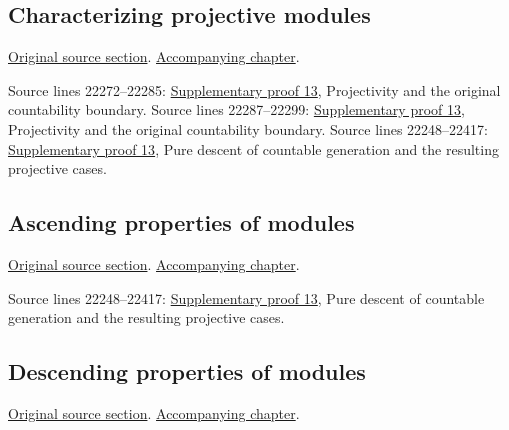 \subsection{Characterizing projective modules}
\hypertarget{algebra-source-section-characterize-projective}{}
\noindent\href{https://github.com/stacks/stacks-project/blob/a04446e57ec1fbc252a871afcec7752fb2807b14/algebra.tex\#L22184}{Original source section}. \href{algebra.pdf\#nameddest=section-characterize-projective}{Accompanying chapter}.

\begin{AlgebraSourceRoutes}
 Source lines 22272--22285: \hyperlink{algebra_ml_coherent_notes_20260927}{Supplementary proof 13}, Projectivity and the original countability boundary.
 Source lines 22287--22299: \hyperlink{algebra_ml_coherent_notes_20260927}{Supplementary proof 13}, Projectivity and the original countability boundary.
 Source lines 22248--22417: \hyperlink{algebra_ml_coherent_notes_20260927}{Supplementary proof 13}, Pure descent of countable generation and the resulting projective cases.
\end{AlgebraSourceRoutes}

\subsection{Ascending properties of modules}
\hypertarget{algebra-source-section-ascent}{}
\noindent\href{https://github.com/stacks/stacks-project/blob/a04446e57ec1fbc252a871afcec7752fb2807b14/algebra.tex\#L22303}{Original source section}. \href{algebra.pdf\#nameddest=section-ascent}{Accompanying chapter}.

\begin{AlgebraSourceRoutes}
 Source lines 22248--22417: \hyperlink{algebra_ml_coherent_notes_20260927}{Supplementary proof 13}, Pure descent of countable generation and the resulting projective cases.
\end{AlgebraSourceRoutes}

\subsection{Descending properties of modules}
\hypertarget{algebra-source-section-descent}{}
\noindent\href{https://github.com/stacks/stacks-project/blob/a04446e57ec1fbc252a871afcec7752fb2807b14/algebra.tex\#L22332}{Original source section}. \href{algebra.pdf\#nameddest=section-descent}{Accompanying chapter}.

